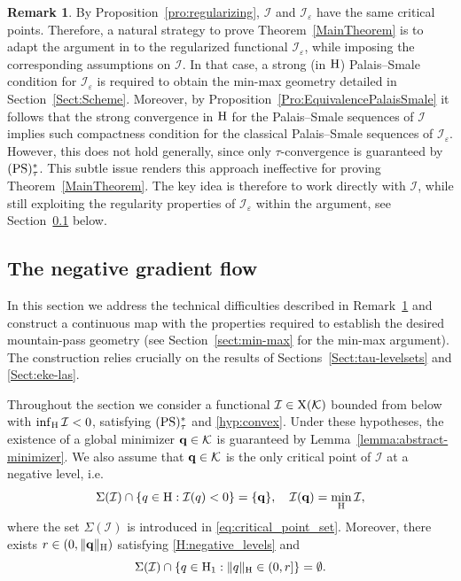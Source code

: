 \documentclass{article}
\newcommand{\boK}{\mathcal{K}}
\newcommand{\boI}{\mathcal{I}}
\newcommand{\Hilb}{{\textnormal H}}
\newcommand{\minq}{{\bf q}}
\newcommand{\X}{{\textnormal X}}
\newcommand{\PS}{(\textnormal{PS})^{*}_\tau}
\theoremstyle{definition}
\newtheorem{remark}{Remark}[section]
\begin{document}
\begin{remark}\label{remark:difficulties}
By Proposition~\ref{pro:regularizing}, $\boI$ and $\boI_\varepsilon$ have the same critical points. Therefore, a natural strategy to prove Theorem~\ref{MainTheorem} is to adapt the argument in \cite[Theorem 4]{Bre-Nir} to the regularized functional $\boI_\varepsilon$, while imposing the corresponding assumptions on $\boI$. In that case, a strong (in $\Hilb$) Palais--Smale condition for $\boI_\varepsilon$ is required to obtain the min-max geometry detailed in Section~\ref{Sect:Scheme}. Moreover, by Proposition~\ref{Pro:EquivalencePalaisSmale} it follows that the strong convergence in $\Hilb$ for the Palais--Smale sequences of $\boI$ implies such compactness condition for the classical Palais--Smale sequences of $\boI_\varepsilon$. However, this does not hold generally, since only $\tau$-convergence is guaranteed by $\PS$. This subtle issue renders this approach ineffective for proving Theorem~\ref{MainTheorem}. The key idea is therefore to work directly with $\boI$, while still exploiting the regularity properties of $\boI_\varepsilon$ within the argument, see Section~\ref{Sect:Negative-Flow} below.
\end{remark}

\subsection{The negative gradient flow}\label{Sect:Negative-Flow}

In this section we address the technical difficulties described in Remark~\ref{remark:difficulties} and construct a continuous map with the properties required to establish the desired mountain-pass geometry (see Section~\ref{sect:min-max} for the min-max argument). The construction relies crucially on the results of Sections~\ref{Sect:tau-levelsets} and \ref{Sect:eke-las}.

Throughout the section we consider a functional $\boI\in\X(\boK)$ bounded from below with $\inf_\Hilb\boI<0$, satisfying $\PS$ and \eqref{hyp:convex}. Under these hypotheses, the existence of a global minimizer $\minq\in\boK$ is guaranteed by Lemma~\ref{lemma:abstract-minimizer}. We also assume that $\minq\in\boK$ is the only critical point of $\boI$ at a negative level, i.e.
\begin{equation}\label{H:existence_unique_minimizer}
    \Sigma(\boI)\cap \{q\in\Hilb: \boI(q)<0\}=\{\minq\},\quad\boI(\minq)=\min_\Hilb\boI,
\end{equation}
where the set $\Sigma(\boI)$ is introduced in \eqref{eq:critical_point_set}. Moreover, there exists $r\in(0,\|\minq\|_\Hilb)$ satisfying \eqref{H:negative_levels} and
\begin{equation}\label{H:zero_isolated}
  \Sigma(\boI)\cap\{q\in\Hilb_1: \|q\|_\Hilb\in(0, r]\}=\emptyset.
\end{equation}
  
\end{document}
